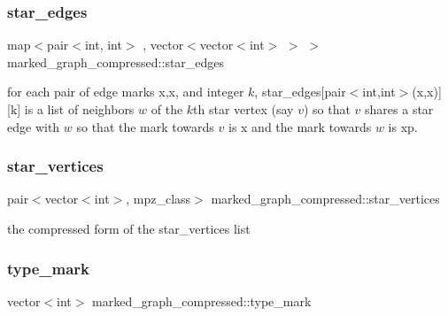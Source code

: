 \mbox{\label{classmarked__graph__compressed_a7df5779d313486644132bd816937f532}} 
\subsubsection{\texorpdfstring{star\+\_\+edges}{star\_edges}}
{\footnotesize\ttfamily map$<$pair$<$int, int$>$ , vector$<$vector$<$int$>$ $>$ $>$ marked\+\_\+graph\+\_\+compressed\+::star\+\_\+edges}



for each pair of edge marks x,x\textquotesingle{}, and integer $k$, star\+\_\+edges\mbox{[}pair$<$int,int$>$(x,x\textquotesingle{})\mbox{]}\mbox{[}k\mbox{]} is a list of neighbors $w$ of the $k$th star vertex (say $v$) so that $v$ shares a star edge with $w$ so that the mark towards $v$ is x and the mark towards $w$ is xp. 

\mbox{\label{classmarked__graph__compressed_a7a4ced4586e2e353f9076bd447df5208}} 
\subsubsection{\texorpdfstring{star\+\_\+vertices}{star\_vertices}}
{\footnotesize\ttfamily pair$<$vector$<$int$>$, mpz\+\_\+class$>$ marked\+\_\+graph\+\_\+compressed\+::star\+\_\+vertices}



the compressed form of the star\+\_\+vertices list 

\mbox{\label{classmarked__graph__compressed_a86b00223525703e973415cbc9c94da68}} 
\subsubsection{\texorpdfstring{type\+\_\+mark}{type\_mark}}
{\footnotesize\ttfamily vector$<$int$>$ marked\+\_\+graph\+\_\+compressed\+::type\+\_\+mark}



